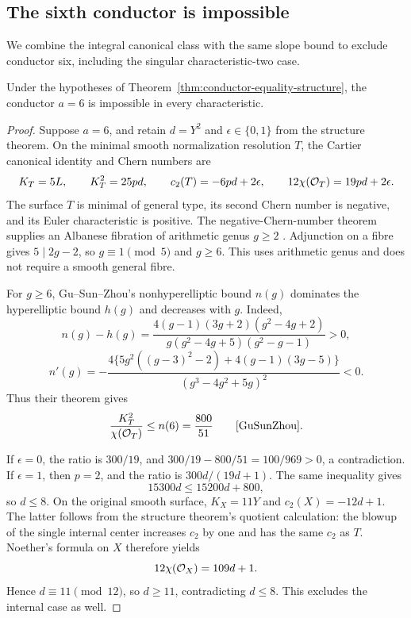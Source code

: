 \subsection{The sixth conductor is impossible}

We combine the integral canonical class with the same slope bound
to exclude conductor six, including the singular characteristic-two case.

\begin{proposition}\label{prop:conductor-six-excluded}
Under the hypotheses of Theorem~\ref{thm:conductor-equality-structure},
the conductor $a=6$ is impossible in every characteristic.
\end{proposition}

\begin{proof}
Suppose $a=6$, and retain $d=Y^2$ and $\epsilon\in\{0,1\}$
from the structure theorem. On the minimal smooth normalization
resolution $T$, the Cartier canonical identity and Chern numbers are
\[
 K_T=5L,\qquad K_T^2=25pd,\qquad
 c_2(T)=-6pd+2\epsilon,\qquad
 12\chi(\mathcal O_T)=19pd+2\epsilon.
\]
The surface $T$ is minimal of general type, its second Chern number
is negative, and its Euler characteristic is positive.
The negative-Chern-number theorem supplies an Albanese fibration
of arithmetic genus $g\geq2$
\cite[Theorems~2 and~7, pp.~264--266]{ShepherdBarronGeography}.
Adjunction on a fibre gives $5\mid2g-2$, so $g\equiv1\pmod5$
and $g\geq6$. This uses arithmetic genus and does not require a
smooth general fibre.

For $g\geq6$, Gu--Sun--Zhou's nonhyperelliptic bound $n(g)$
dominates the hyperelliptic bound $h(g)$ and decreases with $g$.
Indeed,
\[
 n(g)-h(g)=
 \frac{4(g-1)(3g+2)(g^2-4g+2)}
 {g(g^2-4g+5)(g^2-g-1)}>0,
\]
\[
 n'(g)=-\frac{4\{5g^2((g-3)^2-2)+4(g-1)(3g-5)\}}
 {(g^3-4g^2+5g)^2}<0.
\]
Thus their theorem gives
\[
 \frac{K_T^2}{\chi(\OO_T)}\leq n(6)=\frac{800}{51}
 \qquad\text{\cite[Theorem~3.2, pp.~622--623]{GuSunZhou}.}
\]

If $\epsilon=0$, the ratio is $300/19$, and
$300/19-800/51=100/969>0$, a contradiction.
If $\epsilon=1$, then $p=2$, and the ratio is
$300d/(19d+1)$. The same inequality gives
\[
 15300d\leq15200d+800,
\]
so $d\leq8$.
On the original smooth surface, $K_X=11Y$ and
$c_2(X)=-12d+1$. The latter follows from the structure theorem's
quotient calculation: the blowup of the single internal center
increases $c_2$ by one and has the same $c_2$ as $T$.
Noether's formula on $X$ therefore yields
\[
 12\chi(\mathcal O_X)=109d+1.
\]
Hence $d\equiv11\pmod{12}$, so $d\geq11$, contradicting
$d\leq8$. This excludes the internal case as well.
\end{proof}
